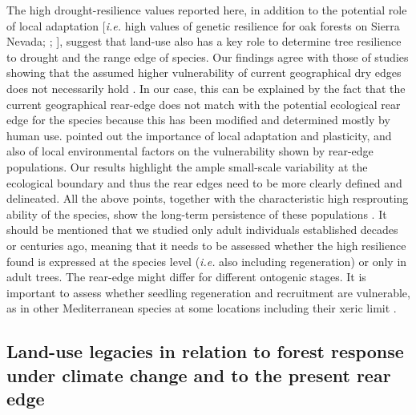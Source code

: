 The high drought-resilience values reported here, in addition to the potential role of local adaptation {[}\emph{i.e.} high values of genetic resilience for oak forests on Sierra Nevada; \textcite{ValbuenaCarabanaGil2013GeneticResilience}; \textcite{ValbuenaCarabanaGil2017CentenaryCoppicing}{]}, suggest that land-use also has a key role to determine tree resilience to drought and the range edge of species. Our findings agree with those of studies showing that the assumed higher vulnerability of current geographical dry edges does not necessarily hold \autocite[\emph{e.g.}][]{CavinJump2017HighestDrought}. In our case, this can be explained by the fact that the current geographical rear-edge does not match with the potential ecological rear edge for the species because this has been modified and determined mostly by human use. \textcite{MartinezVilalta2018RearWindow} pointed out the importance of local adaptation and plasticity, and also of local environmental factors on the vulnerability shown by rear-edge populations. Our results highlight the ample small-scale variability at the ecological boundary and thus the rear edges need to be more clearly defined and delineated. All the above points, together with the characteristic high resprouting ability of the species, show the long-term persistence of these populations \autocite{BellinghamSparrow2000ResproutingLife}. It should be mentioned that we studied only adult individuals established decades or centuries ago, meaning that it needs to be assessed whether the high resilience found is expressed at the species level (\emph{i.e.} also including regeneration) or only in adult trees. The rear-edge might differ for different ontogenic stages. It is important to assess whether seedling regeneration and recruitment are vulnerable, as in other Mediterranean species at some locations including their xeric limit \autocite{Castroetal2004SeedlingEstablishment,VilaCabreraetal2011StructuralClimatic,GeaIzquierdoetal2015ThisEnd}.

\subsection{Land-use legacies in relation to forest response under climate change and to the present rear edge}\label{sec:dendro:Land}

